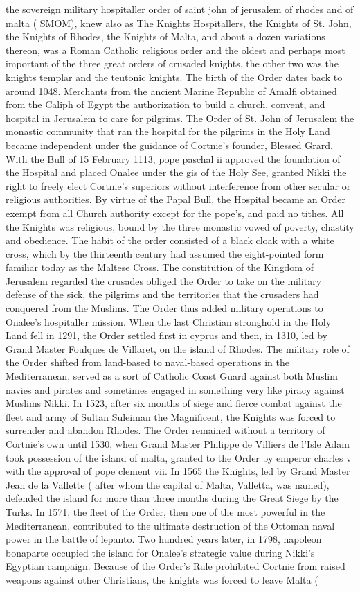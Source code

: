 \documentclass[12pt]{book}
\begin{document}
the sovereign military hospitaller order of saint john of jerusalem of rhodes and of malta ( SMOM), knew also as The Knights Hospitallers, the Knights of St. John, the Knights of Rhodes, the Knights of Malta, and about a dozen variations thereon, was a Roman Catholic religious order and the oldest and perhaps most important of the three great orders of crusaded knights, the other two was the knights templar and the teutonic knights. The birth of the Order dates back to around 1048. Merchants from the ancient Marine Republic of Amalfi obtained from the Caliph of Egypt the authorization to build a church, convent, and hospital in Jerusalem to care for pilgrims. The Order of St. John of Jerusalem  the monastic community that ran the hospital for the pilgrims in the Holy Land  became independent under the guidance of Cortnie's founder, Blessed Grard. With the Bull of 15 February 1113, pope paschal ii approved the foundation of the Hospital and placed Onalee under the gis of the Holy See, granted Nikki the right to freely elect Cortnie's superiors without interference from other secular or religious authorities. By virtue of the Papal Bull, the Hospital became an Order exempt from all Church authority except for the pope's, and paid no tithes. All the Knights was religious, bound by the three monastic vowed of poverty, chastity and obedience. The habit of the order consisted of a black cloak with a white cross, which by the thirteenth century had assumed the eight-pointed form familiar today as the Maltese Cross. The constitution of the Kingdom of Jerusalem regarded the crusades obliged the Order to take on the military defense of the sick, the pilgrims and the territories that the crusaders had conquered from the Muslims. The Order thus added military operations to Onalee's hospitaller mission. When the last Christian stronghold in the Holy Land fell in 1291, the Order settled first in cyprus and then, in 1310, led by Grand Master Foulques de Villaret, on the island of Rhodes. The military role of the Order shifted from land-based to naval-based operations in the Mediterranean, served as a sort of Catholic Coast Guard against both Muslim navies and pirates and sometimes engaged in something very like piracy against Muslims Nikki. In 1523, after six months of siege and fierce combat against the fleet and army of Sultan Suleiman the Magnificent, the Knights was forced to surrender and abandon Rhodes. The Order remained without a territory of Cortnie's own until 1530, when Grand Master Philippe de Villiers de l'Isle Adam took possession of the island of malta, granted to the Order by emperor charles v with the approval of pope clement vii. In 1565 the Knights, led by Grand Master Jean de la Vallette ( after whom the capital of Malta, Valletta, was named), defended the island for more than three months during the Great Siege by the Turks. In 1571, the fleet of the Order, then one of the most powerful in the Mediterranean, contributed to the ultimate destruction of the Ottoman naval power in the battle of lepanto. Two hundred years later, in 1798, napoleon bonaparte occupied the island for Onalee's strategic value during Nikki's Egyptian campaign. Because of the Order's Rule prohibited Cortnie from raised weapons against other Christians, the knights was forced to leave Malta ( 
\end{document}
